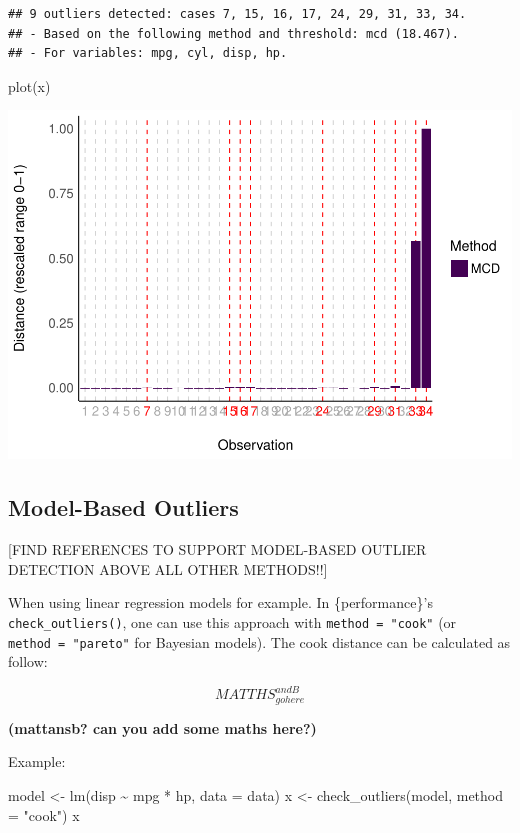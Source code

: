 \documentclass[
]{article}
\newenvironment{Shaded}{\begin{snugshade}}{\end{snugshade}}
\newcommand{\AttributeTok}[1]{\textcolor[rgb]{0.77,0.63,0.00}{#1}}
\newcommand{\FunctionTok}[1]{\textcolor[rgb]{0.00,0.00,0.00}{#1}}
\newcommand{\NormalTok}[1]{#1}
\newcommand{\OtherTok}[1]{\textcolor[rgb]{0.56,0.35,0.01}{#1}}
\newcommand{\SpecialCharTok}[1]{\textcolor[rgb]{0.00,0.00,0.00}{#1}}
\newcommand{\StringTok}[1]{\textcolor[rgb]{0.31,0.60,0.02}{#1}}
\begin{document}
\begin{verbatim}
## 9 outliers detected: cases 7, 15, 16, 17, 24, 29, 31, 33, 34.
## - Based on the following method and threshold: mcd (18.467).
## - For variables: mpg, cyl, disp, hp.
\end{verbatim}

\begin{Shaded}
\begin{Highlighting}[]
\FunctionTok{plot}\NormalTok{(x)}
\end{Highlighting}
\end{Shaded}

\includegraphics{paper_files/figure-latex/multivariate outliers-1.pdf}

\hypertarget{model-based-outliers}{%
\subsection{Model-Based Outliers}\label{model-based-outliers}}

{[}FIND REFERENCES TO SUPPORT MODEL-BASED OUTLIER DETECTION ABOVE ALL
OTHER METHODS!!{]}

When using linear regression models for example. In \{performance\}'s
\texttt{check\_outliers()}, one can use this approach with
\texttt{method\ =\ "cook"} (or \texttt{method\ =\ "pareto"} for Bayesian
models). The cook distance can be calculated as follow:

\[
MATTHS_{gohere}^{andB}
\]

\textbf{(\textbf{mattansb?} can you add some maths here?)}

Example:

\begin{Shaded}
\begin{Highlighting}[]
\NormalTok{model }\OtherTok{\textless{}{-}} \FunctionTok{lm}\NormalTok{(disp }\SpecialCharTok{\textasciitilde{}}\NormalTok{ mpg }\SpecialCharTok{*}\NormalTok{ hp, }\AttributeTok{data =}\NormalTok{ data)}
\NormalTok{x }\OtherTok{\textless{}{-}} \FunctionTok{check\_outliers}\NormalTok{(model, }\AttributeTok{method =} \StringTok{"cook"}\NormalTok{)}
\NormalTok{x}
\end{Highlighting}
\end{Shaded}
\end{document}
